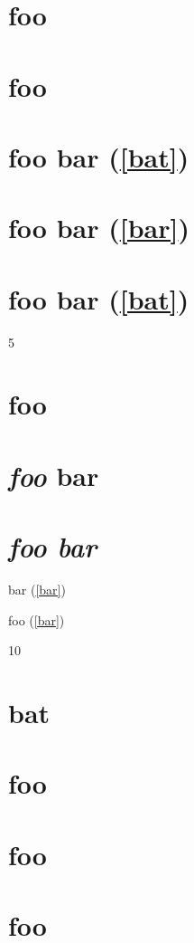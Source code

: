 
\def\mytitle{Advanced Headers}
\def\baz{bat}


\part{foo}
\label{bar}

\part{foo}
\label{bar}

\part{foo bar (\autoref{bat})}
\label{foobarbat}

\part{foo bar (\autoref{bar})}
\label{bat}

\part{foo bar (\autoref{bat})}
\label{baz}

5

\part{foo}
\label{bar}

\part{\emph{foo} bar}
\label{foobar}

\part{\emph{foo
bar}}
\label{foobar}

bar (\autoref{bar})

foo (\autoref{bar})

10

\part{bat}
\label{baz}

\part{foo}
\label{bar}

\part{foo}
\label{bar}

\part{foo}
\label{bar}



